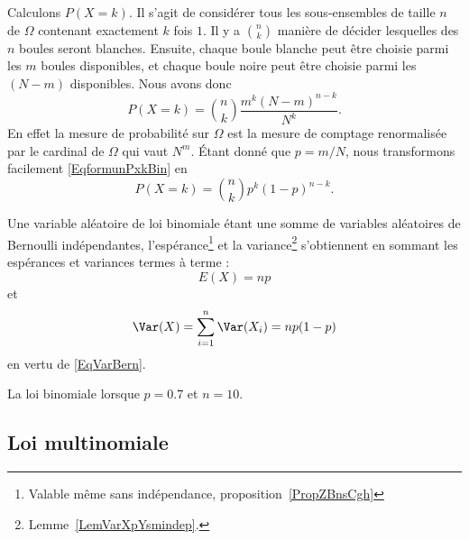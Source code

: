 Calculons \( P(X=k)\). Il s'agit de considérer tous les sous-ensembles de taille \( n\) de \( \Omega\) contenant exactement \( k\) fois \( 1\). Il y a \( {n\choose k}\) manière de décider lesquelles des \( n\) boules seront blanches. Ensuite, chaque boule blanche peut être choisie parmi les \( m\) boules disponibles, et chaque boule noire peut être choisie parmi les  \( (N-m)\) disponibles. Nous avons donc
\begin{equation}        \label{EqformunPxkBin}
	P(X=k)={n\choose k}\frac{ m^k(N-m)^{n-k} }{ N^k }.
\end{equation}
En effet la mesure de probabilité sur \( \Omega\) est la mesure de comptage renormalisée par le cardinal de \( \Omega\) qui vaut \( N^m\). Étant donné que \( p=m/N\), nous transformons facilement \eqref{EqformunPxkBin} en
\begin{equation}
	P(X=k)={n\choose k}p^k(1-p)^{n-k}.
\end{equation}

Une variable aléatoire de loi binomiale étant une somme de variables aléatoires de Bernoulli indépendantes, l'espérance\footnote{Valable même sans indépendance, proposition~\ref{PropZBnsCgh}} et la variance\footnote{Lemme~\ref{LemVarXpYsmindep}.} s'obtiennent en sommant les espérances et variances termes à terme  :
\begin{equation}    \label{EqDGbBgrv}
	E(X)=np
\end{equation}
et
\begin{equation}    \label{EqKLubWlh}
	\Var(X)=\sum_{i=1}^n\Var(X_i)=np(1-p)
\end{equation}
en vertu de \eqref{EqVarBern}.

La loi binomiale lorsque \( p=0.7\) et \( n=10\).       %

\begin{center}
	
\end{center}

\subsection{Loi multinomiale}

